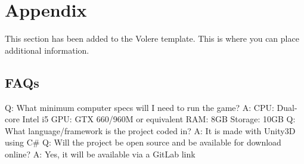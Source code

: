 \documentclass[12pt, titlepage]{article}
\begin{document}







\newpage

\section{Appendix}

This section has been added to the Volere template.  This is where you can place
additional information.

\subsection{FAQs}

Q: What minimum computer specs will I need to run the game?
\newline
A: CPU: Dual-core Intel i5    
GPU: GTX 660/960M or equivalent
RAM: 8GB
Storage: 10GB
\newline
\newline
Q: What language/framework is the project coded in?
\newline
A: It is made with Unity3D using C\#
\newline
\newline
Q: Will the project be open source and be available for download online?
\newline
A: Yes, it will be available via a GitLab link


\end{document}
